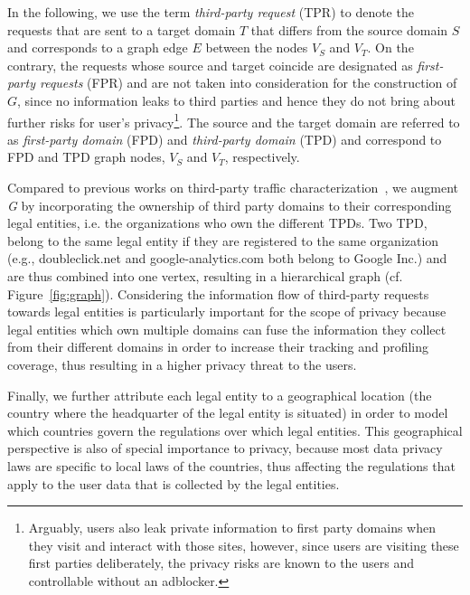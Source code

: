 \documentclass[compsoc, conference, letterpaper, 10pt, times]{IEEEtran}
\begin{document}
In the following, we use the term \textit{third-party request} (TPR) to denote the requests that are sent to a target domain $T$ that differs from the source domain $S$ and corresponds to a graph edge $E$ between the nodes $V_S$ and $V_T$. On the contrary, the requests whose source and target coincide are designated as \textit{first-party requests} (FPR) and are not taken into consideration for the construction of $G$, since no information leaks to third parties and hence they do not bring about further risks for user's privacy\footnote{Arguably, users also leak private information to first party domains when they visit and interact with those sites, however, since users are visiting these first parties deliberately, the privacy risks are known to the users and controllable without an adblocker.}. The source and the target domain are referred to as \textit{first-party domain} (FPD) and \textit{third-party domain} (TPD) and correspond to FPD and TPD graph nodes, $V_S$ and $V_T$, respectively.

Compared to previous works on third-party traffic characterization~\cite{butkiewicz,englehardt}, we augment \emph{G} by incorporating the ownership of third party domains to their corresponding legal entities, i.e. the organizations who own the different TPDs. Two TPD, belong to the same legal entity if they are registered to the same organization (e.g., doubleclick.net and google-analytics.com both belong to Google Inc.) and are thus combined into one vertex, resulting in a hierarchical graph (cf. Figure~\ref{fig:graph}). Considering the information flow of third-party requests towards legal entities is particularly important for the scope of privacy because legal entities which own multiple domains can fuse the information they collect from their different domains in order to increase their tracking and profiling coverage, thus resulting in a higher privacy threat to the users. 

Finally, we further attribute each legal entity to a geographical location (the country where the headquarter of the legal entity is situated) in order to model which countries govern the regulations over which legal entities. This geographical perspective is also of special importance to privacy, because most data privacy laws are specific to local laws of the countries, thus affecting the regulations that apply to the user data that is collected by the legal entities.
\end{document}
